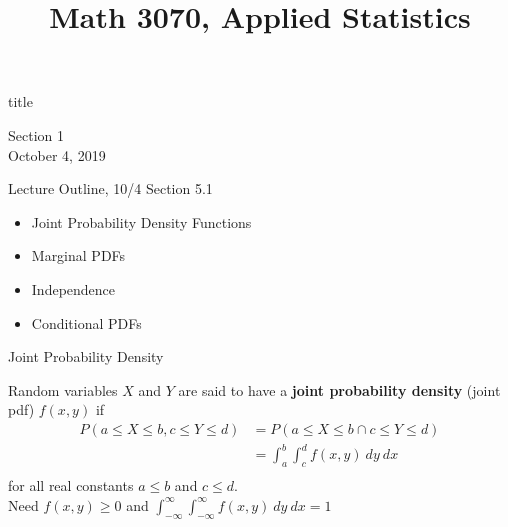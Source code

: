 \documentclass[t,handout]{beamer}
\title{Math 3070, Applied Statistics}
\newcommand{\nl}[1]{\vspace{#1 em}}
\begin{document}
\begin{frame}[c]
    \begin{beamercolorbox}[rounded=true,wd=\textwidth,center]{title}
        \inserttitle
    \end{beamercolorbox}
    \begin{center}
        Section 1\\
        \nl{0.5}
        October 4, 2019
    \end{center}
\end{frame}
\begin{frame}[c]{Lecture Outline, 10/4}
    Section 5.1
    \begin{itemize}
        \item Joint Probability Density Functions
        \item Marginal PDFs
        \item Independence
        \item Conditional PDFs
    \end{itemize}
\end{frame}
\begin{frame}[c]{Joint Probability Density}
    \begin{block}{}
        Random variables $X$ and $Y$ are said to have a \textbf{joint probability density} (joint pdf) $f(x,y)$ if
        \begin{align*}
            P(a \leq X \leq b, c \leq Y \leq d) & = P(a \leq X \leq b \cap c \leq Y \leq d) \\
                                                & = \int_a^b\int_c^d f(x,y)\ dy\ dx         \\
        \end{align*}
        for all real constants $a\leq b$ and $c\leq d$.\\
        Need $f(x,y)\geq 0$ and $\int_{-\infty}^\infty\int_{-\infty}^\infty f(x,y)\ dy\ dx=1$
    \end{block}
\end{frame}
\end{document}
